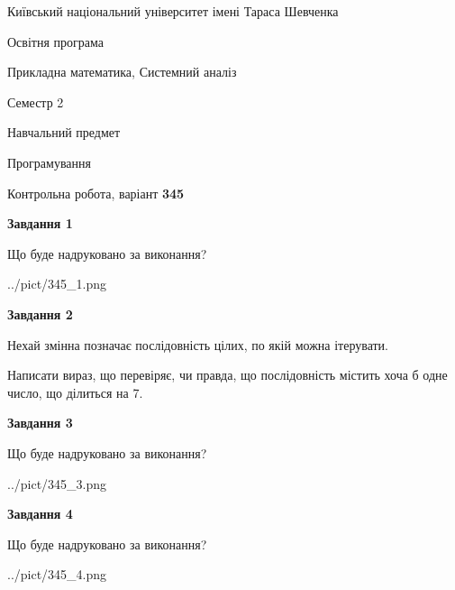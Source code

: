\documentclass[12pt, ukrainian]{article}
\begin{document}
{{\begin {small}\par
{ \center  Київський національний університет імені Тараса Шевченка \par}
{\parbox {5 cm}{Освітня програма \hfill}{\parbox {8 cm}{Прикладна математика, Системний аналіз \hfill}}\parbox {5 cm}{\hfill Семестр 2}}\par
{\parbox {5 cm} {Навчальний предмет \hfill}\parbox {7 cm}{Програмування \hfill}\parbox {6cm}{\hfill}\par}\vspace{-7pt} \end{small}}{\center Контрольна робота, варіант  \No \textbf
{ 345 }\par}}
{
\begin {large}
{\begin {center}\textbf{Завдання 1}\end {center}}\par
Що буде надруковано за виконання?\par\par
\begin{center}
	{../pict/345_1.png}
\end{center}
\newpage

{\begin {center}\textbf{Завдання 2}\end {center}}\par
Нехай змінна  позначає послідовність цілих, по якій можна ітерувати.

Написати вираз, що перевіряє, чи правда, що послідовність  містить хоча б одне число, що ділиться на 7.\par
\newpage

{\begin {center}\textbf{Завдання 3}\end {center}}\par
Що буде надруковано за виконання?\par
\begin{center}
	{../pict/345_3.png}
\end{center}
\newpage

{\begin {center}\textbf{Завдання 4}\end {center}}\par
Що буде надруковано за виконання?\par
\begin{center}
	{../pict/345_4.png}
\end{center}
\newpage


\end{large}}
\end{document}
